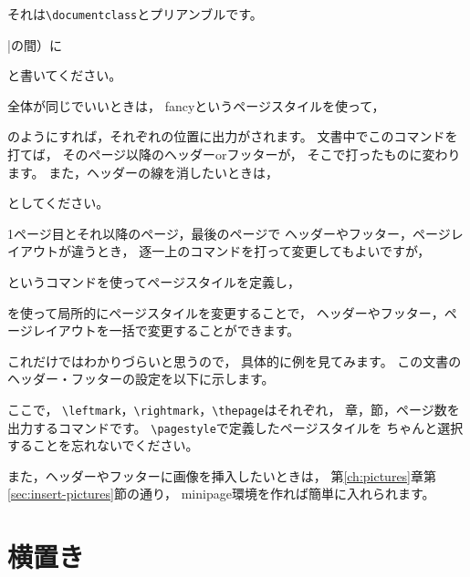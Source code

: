 それは\verb|\documentclass|とプリアンブルです。
\begin{document}
|の間）に
\begin{ITeX}
\usepackage{fancyhdr}
\end{ITeX}
と書いてください。

全体が同じでいいときは，
fancyというページスタイルを使って，
\begin{ITeX}
\end{ITeX}
のようにすれば，それぞれの位置に出力がされます。
文書中でこのコマンドを打てば，
そのページ以降のヘッダーorフッターが，
そこで打ったものに変わります。
また，ヘッダーの線を消したいときは，
\begin{ITeX}
\renewcommand{\headrule}{}
\end{ITeX}
としてください。

1ページ目とそれ以降のページ，最後のページで
ヘッダーやフッター，ページレイアウトが違うとき，
逐一上のコマンドを打って変更してもよいですが，
\begin{ITeX}
\end{ITeX}
というコマンドを使ってページスタイルを定義し，
\begin{ITeX}
\thispagestyle{ページスタイル}
\end{ITeX}
を使って局所的にページスタイルを変更することで，
ヘッダーやフッター，ページレイアウトを一括で変更することができます。

これだけではわかりづらいと思うので，
具体的に例を見てみます。
この文書のヘッダー・フッターの設定を以下に示します。

\begin{ITeX}
\pagestyle{normal}
\end{ITeX}

ここで，
\verb|\leftmark|，\verb|\rightmark|，\verb|\thepage|はそれぞれ，
章，節，ページ数を出力するコマンドです。
\verb|\pagestyle|で定義したページスタイルを
ちゃんと選択することを忘れないでください。

また，ヘッダーやフッターに画像を挿入したいときは，
第\ref{ch:pictures}章第\ref{sec:insert-pictures}節の通り，
minipage環境を作れば簡単に入れられます。



\section{横置き}
\end{document}
